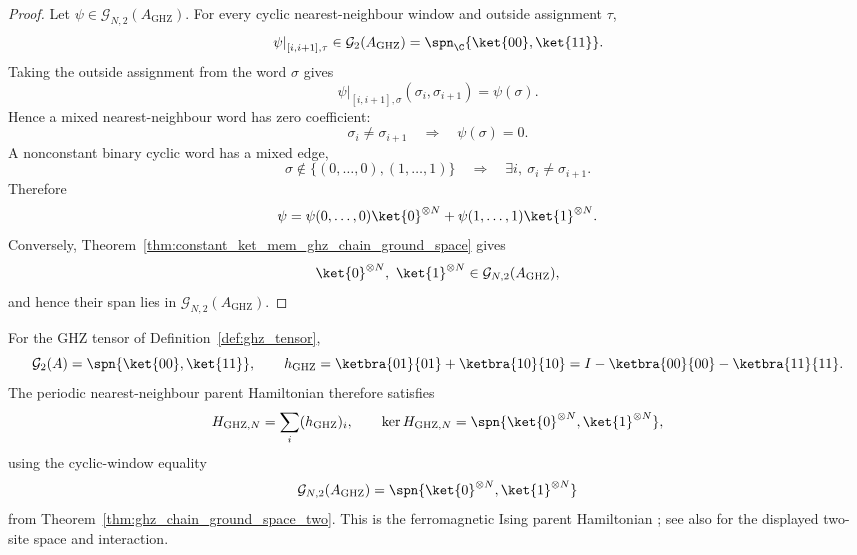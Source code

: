 \begin{proof}
    \leanok
    Let $\psi\in\mathcal G_{N,2}(A_{\mathrm{GHZ}})$.  For every cyclic
    nearest-neighbour window and outside assignment $\tau$,
    \[
        \left.\psi\right|_{[i,i+1],\tau}
        \in
        \mathcal G_2(A_{\mathrm{GHZ}})
        =
        \spn_{\C}\{\ket{00},\ket{11}\}.
    \]
    Taking the outside assignment from the word $\sigma$ gives
    \[
        \left.\psi\right|_{[i,i+1],\sigma}(\sigma_i,\sigma_{i+1})
        =
        \psi(\sigma).
    \]
    Hence a mixed nearest-neighbour word has zero coefficient:
    \[
        \sigma_i\ne\sigma_{i+1}
        \quad\Longrightarrow\quad
        \psi(\sigma)=0.
    \]
    A nonconstant binary cyclic word has a mixed edge,
    \[
        \sigma\notin\{(0,\ldots,0),(1,\ldots,1)\}
        \quad\Longrightarrow\quad
        \exists i,\ \sigma_i\ne\sigma_{i+1}.
    \]
    Therefore
    \[
        \psi
        =
        \psi(0,\ldots,0)\ket{0}^{\otimes N}
        +
        \psi(1,\ldots,1)\ket{1}^{\otimes N}.
    \]
    Conversely, Theorem~\ref{thm:constant_ket_mem_ghz_chain_ground_space} gives
    \[
        \ket{0}^{\otimes N},\ \ket{1}^{\otimes N}
        \in
        \mathcal G_{N,2}(A_{\mathrm{GHZ}}),
    \]
    and hence their span lies in $\mathcal G_{N,2}(A_{\mathrm{GHZ}})$.
\end{proof}

\begin{remark}\label{rem:ghz_parent_interaction}
    For the GHZ tensor of Definition~\ref{def:ghz_tensor},
    \[
        \mathcal G_2(A)
        =
        \spn\{\ket{00},\ket{11}\},
        \qquad
        h_{\mathrm{GHZ}}
        =
        \ketbra{01}{01}+\ketbra{10}{10}
        =
        I-\ketbra{00}{00}-\ketbra{11}{11}.
    \]
    The periodic nearest-neighbour parent Hamiltonian therefore satisfies
    \[
        H_{\mathrm{GHZ},N}
        =
        \sum_i (h_{\mathrm{GHZ}})_i,
        \qquad
        \ker H_{\mathrm{GHZ},N}
        =
        \spn\{\ket{0}^{\otimes N},\ket{1}^{\otimes N}\},
    \]
    using the cyclic-window equality
    \[
        \mathcal G_{N,2}(A_{\mathrm{GHZ}})
        =
        \spn\{\ket{0}^{\otimes N},\ket{1}^{\otimes N}\}
    \]
    from Theorem~\ref{thm:ghz_chain_ground_space_two}.
    This is the ferromagnetic Ising parent Hamiltonian
    \cite[lines~1194--1196 and line~2205]{Cirac2021Matrix};
    see also \cite[Section~3]{FernandezGonzalez2015Uncle} for the displayed
    two-site space and interaction.
\end{remark}

